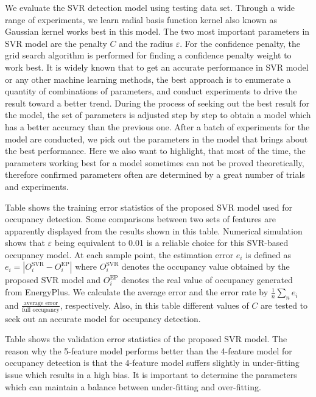 We evaluate the SVR detection model using
testing data set. Through a wide range of experiments, we learn radial
basis function kernel also known as Gaussian kernel works best in this
model. The two most important parameters in SVR model
are the penalty $C$ and the radius $\varepsilon$. For the confidence penalty,
the grid search algorithm \cite{Hsu2003} is performed for finding a confidence
penalty weight to work best.
It is widely known that to get an accurate performance in SVR model or any other machine
learning methods, the best approach is to enumerate a quantity of
combinations of parameters, and conduct experiments to drive the
result toward a better trend. During the process of seeking out the
best result for the model, the set of parameters is adjusted step by
step to obtain a model which has a better accuracy than the previous
one. After a batch of experiments for the model are conducted, we pick
out the parameters in the model that brings about the best
performance. Here we also want to highlight, that most of the time,
the parameters working best for a model sometimes can not be proved
theoretically, therefore confirmed parameters often are determined by
a great number of trials and experiments.

Table  shows the training error statistics of the proposed SVR
model used for occupancy detection. Some comparisons between two sets
of features are apparently displayed from the results shown in this
table. Numerical simulation shows that $\varepsilon$ being equivalent
to 0.01 is a reliable choice for this SVR-based occupancy model. At
each sample point, the estimation error ${e_i}$ is defined as
${e_i} = \left| {O_i^{\textrm{SVR}} - O_i^{\textrm{EP}}} \right|$ where $O_i^{\textrm{SVR}}$
denotes the occupancy value obtained by the proposed SVR model and
$O_i^{\textrm{EP}}$ denotes the real value of occupancy generated from EnergyPlus. We calculate the average error and the error rate by
$\frac{1}{n}\sum\nolimits_n {{e_i}}$ and
$\frac{\text{average error}}{\text{full occupancy}}$,
respectively. Also, in this table different values of $C$ are tested
to seek out an accurate model for occupancy detection.

Table  shows the validation error statistics of the proposed SVR model.
The reason why the 5-feature model performs better than the 4-feature
model for occupancy detection is that the 4-feature model suffers slightly in
under-fitting issue which results in a high bias. It is important to determine
the parameters which can maintain a balance between under-fitting and
over-fitting.


